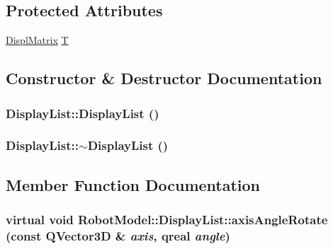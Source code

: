 \subsection*{Protected Attributes}
\begin{DoxyCompactItemize}
\item 
\hyperlink{class_robot_model_1_1_displ_matrix}{DisplMatrix} \hyperlink{class_robot_model_1_1_display_list_a9058babda6102fe41186f806990aa350}{T}
\end{DoxyCompactItemize}


\subsection{Constructor \& Destructor Documentation}
\hypertarget{class_robot_model_1_1_display_list_a71d74802d0190f52c0c4ad7c6d5351f9}{
\subsubsection[{DisplayList}]{\setlength{\rightskip}{0pt plus 5cm}DisplayList::DisplayList ()}}
\label{class_robot_model_1_1_display_list_a71d74802d0190f52c0c4ad7c6d5351f9}
\hypertarget{class_robot_model_1_1_display_list_a4c2105212d624723af920c798c1712cf}{
\subsubsection[{$\sim$DisplayList}]{\setlength{\rightskip}{0pt plus 5cm}DisplayList::$\sim$DisplayList ()}}
\label{class_robot_model_1_1_display_list_a4c2105212d624723af920c798c1712cf}


\subsection{Member Function Documentation}
\hypertarget{class_robot_model_1_1_display_list_a9a7084168997ac285ee1e9f4041a8d57}{
\subsubsection[{axisAngleRotate}]{\setlength{\rightskip}{0pt plus 5cm}virtual void RobotModel::DisplayList::axisAngleRotate (const QVector3D \& {\em axis}, \/  qreal {\em angle})}}
\label{class_robot_model_1_1_display_list_a9a7084168997ac285ee1e9f4041a8d57}


